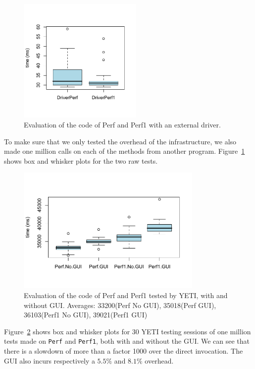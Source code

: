 \begin{figure}[h!]
\begin{center}
\includegraphics[width=6cm]{images/DriverWhiskers.pdf}
\end{center}
\caption{Evaluation of the code of Perf and Perf1 with an external driver.}\label{fig:perfDriver}
\end{figure}

To make sure that we only tested the overhead of the infrastructure, we also made one million calls on each of the methods from another program. Figure~\ref{fig:perfDriver} shows box and whisker plots for the two raw tests.

\begin{figure}[h!]
\begin{center}
\includegraphics[width=9cm]{images/PerfWhiskers.pdf}
\end{center}
\caption{Evaluation of the code of Perf and Perf1 tested by YETI, with and without GUI. Averages: 33200(Perf No GUI), 35018(Perf GUI), 36103(Perf1 No GUI), 39021(Perf1 GUI)}\label{fig:perfValue}
\end{figure}

Figure~\ref{fig:perfValue} shows box and whisker plots for 30 YETI testing sessions of one million tests made on \texttt{Perf} and \texttt{Perf1}, both with and without the GUI. We can see that there is a slowdown of more than a factor 1000 over the direct invocation. The GUI also incurs respectively a $5.5\%$ and $8.1\%$ overhead.



